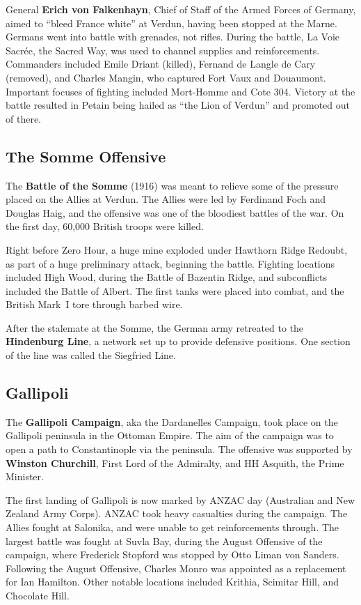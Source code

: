 General \textbf{Erich von Falkenhayn}, Chief of Staff of the Armed Forces of Germany,
aimed to ``bleed France white'' at Verdun, having been stopped at the Marne.
Germans went into battle with grenades, not rifles.
During the battle, La Voie Sacr\'ee, the Sacred Way, was used to channel supplies and reinforcements.
Commanders included Emile Driant (killed), Fernand de Langle de Cary (removed),
and Charles Mangin, who captured Fort Vaux and Douaumont.
Important focuses of fighting included Mort-Homme and Cote 304.
Victory at the battle resulted in Petain being hailed as ``the Lion of Verdun'' and promoted out of there.

\subsection*{The Somme Offensive}

The \textbf{Battle of the Somme} (1916) was meant to relieve some of the pressure placed on the Allies at Verdun.
The Allies were led by Ferdinand Foch and Douglas Haig,
and the offensive was one of the bloodiest battles of the war.
On the first day, 60,000 British troops were killed.

Right before Zero Hour, a huge mine exploded under Hawthorn Ridge Redoubt,
as part of a huge preliminary attack, beginning the battle.
Fighting locations included High Wood, during the Battle of Bazentin Ridge,
and subconflicts included the Battle of Albert.
The first tanks were placed into combat, and the British Mark~I tore through barbed wire.

After the stalemate at the Somme, the German army retreated to the \textbf{Hindenburg Line},
a network set up to provide defensive positions.
One section of the line was called the Siegfried Line.

\subsection*{Gallipoli}

The \textbf{Gallipoli Campaign}, aka the Dardanelles Campaign,
took place on the Gallipoli peninsula in the Ottoman Empire.
The aim of the campaign was to open a path to Constantinople via the peninsula.
The offensive was supported by \textbf{Winston Churchill}, First Lord of the Admiralty,
and HH Asquith, the Prime Minister.

The first landing of Gallipoli is now marked by ANZAC day (Australian and New Zealand Army Corps).
ANZAC took heavy casualties during the campaign.
The Allies fought at Salonika, and were unable to get reinforcements through.
The largest battle was fought at Suvla Bay, during the August Offensive of the campaign,
where Frederick Stopford was stopped by Otto Liman von Sanders.
Following the August Offensive, Charles Monro was appointed as a replacement for Ian Hamilton.
Other notable locations included Krithia, Scimitar Hill, and Chocolate Hill.


